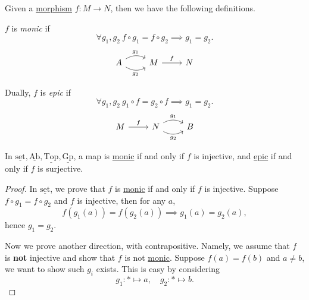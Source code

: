 \begin{definition*}
	Given a \hyperref[def:morphism]{morphism} \(f\colon M\to N\), then we have the following definitions.
	\begin{definition}[Monic]\label{def:monic}
		\(f\) is \emph{monic} if
		\[
			\forall g_1, g_2\ f\circ g_1 = f\circ g_2 \implies g_1 = g_2.
		\]
		\[
			\begin{tikzcd}
				A\ar[r, bend left, "g_1"]\ar[r, bend right, "g_2"']& M \ar[r, "f"]& N
			\end{tikzcd}
		\]
	\end{definition}

	\begin{definition}[Epic]\label{def:epic}
		Dually, \(f\) is \emph{epic} if
		\[
			\forall g_1, g_2\ g_{1} \circ f = g_2 \circ f \implies g_1 = g_2.
		\]
		\[
			\begin{tikzcd}
				M\ar[r, "f"]& N\ar[r, bend left, "g_1"]\ar[r, bend right, "g_2"']& B
			\end{tikzcd}
		\]
	\end{definition}
\end{definition*}

\begin{lemma}
	In \(\underline{\mathrm{set}}, \underline{\mathrm{Ab}}, \underline{\mathrm{Top}}, \underline{\mathrm{Gp}}\), a map is \hyperref[def:monic]{monic} if and only
	if \(f\) is injective, and \hyperref[def:epic]{epic} if and only if \(f\) is surjective.
\end{lemma}
\begin{proof}
	In \(\underline{\mathrm{set}}\), we prove that \(f\) is \hyperref[def:monic]{monic} if and only if \(f\) is injective. Suppose
	\(f\circ g_1 = f\circ g_2\) and \(f\) is injective, then for any \(a\),
	\[
		f(g_1(a)) = f(g_2(a))\implies g_1(a) = g_2(a),
	\]
	hence \(g_1 = g_2\).

	\par Now we prove another direction, with contrapositive. Namely, we assume that \(f\) is \textbf{not} injective and show that
	\(f\) is not \hyperref[def:monic]{monic}. Suppose \(f(a) = f(b)\) and \(a\neq b\), we want to show such \(g_{i}\) exists. This is easy by considering
	\[
		g_1\colon \ast\mapsto a,\quad g_2\colon \ast\mapsto b.
	\]
\end{proof}

